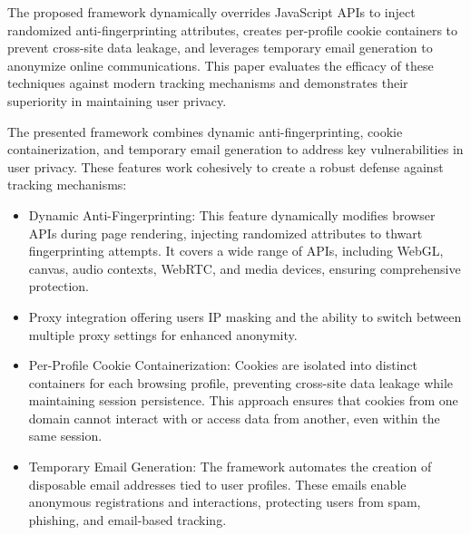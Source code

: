 \documentclass[conference]{IEEEtran}
\begin{document}
The proposed framework dynamically overrides JavaScript APIs to inject randomized anti-fingerprinting attributes, creates per-profile cookie containers to prevent cross-site data leakage, and leverages temporary email generation to anonymize online communications. This paper evaluates the efficacy of these techniques against modern tracking mechanisms and demonstrates their superiority in maintaining user privacy.

The presented framework combines dynamic anti-fingerprinting, cookie containerization, and temporary email generation to address key vulnerabilities in user privacy. These features work cohesively to create a robust defense against tracking mechanisms:

\begin{itemize}
    \item Dynamic Anti-Fingerprinting: This feature dynamically modifies browser APIs during page rendering, injecting randomized attributes to thwart fingerprinting attempts. It covers a wide range of APIs, including WebGL, canvas, audio contexts, WebRTC, and media devices, ensuring comprehensive protection.
    \item Proxy integration offering users IP masking and the ability to switch between multiple proxy settings for enhanced anonymity.
    \item Per-Profile Cookie Containerization: Cookies are isolated into distinct containers for each browsing profile, preventing cross-site data leakage while maintaining session persistence. This approach ensures that cookies from one domain cannot interact with or access data from another, even within the same session.
    \item Temporary Email Generation: The framework automates the creation of disposable email addresses tied to user profiles. These emails enable anonymous registrations and interactions, protecting users from spam, phishing, and email-based tracking.



\end{itemize}

\end{document}
